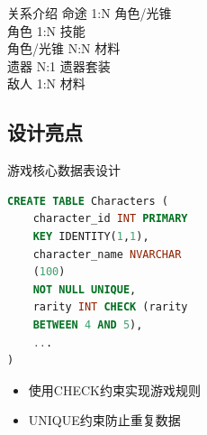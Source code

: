 \documentclass{beamer}
\begin{document}
\begin{frame}{关系介绍}
\centering
命途 1:N 角色/光锥\\
\vspace{0.4cm}
角色 1:N 技能\\
\vspace{0.4cm}
角色/光锥 N:N 材料\\
\vspace{0.4cm}
遗器 N:1 遗器套装\\
\vspace{0.4cm}
敌人 1:N 材料

\end{frame}




\subsection{设计亮点}

\begin{frame}[fragile]{游戏核心数据表设计}
    \begin{minipage}{0.6\linewidth}
\begin{lstlisting}[language=sql]
CREATE TABLE Characters (
    character_id INT PRIMARY
    KEY IDENTITY(1,1),
    character_name NVARCHAR
    (100)
    NOT NULL UNIQUE,
    rarity INT CHECK (rarity 
    BETWEEN 4 AND 5),
    ...
)

\end{lstlisting}
    \end{minipage}\hspace{0.5cm}
    \begin{minipage}{0.25\linewidth}
        \begin{itemize}
            \item 使用CHECK约束实现游戏规则
            \item UNIQUE约束防止重复数据
            
        \end{itemize}
    \end{minipage}
    \medskip
\end{frame}
\end{document}
